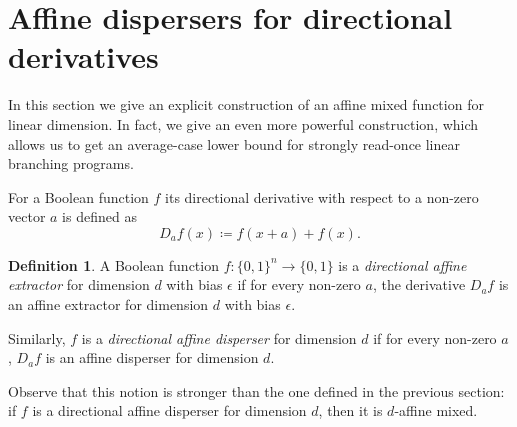 \documentclass[a4paper,11pt,draft]{article}
\newtheorem{proposition}[theorem]{Proposition}
\theoremstyle{definition}
\newtheorem{definition}[theorem]{Definition}
\theoremstyle{remark}
\DeclareMathOperator{\bias}{bias}
\DeclareMathOperator{\E}{\mathbb{E}}
\newcommand{\card}[1]{{\left|#1\right|}}
\newcommand{\Q}{{\{0,1\}}}
\newcommand{\restr}[2]{\left.#1\right|_{#2}}
\newcommand{\sreadonce}{strongly read-once}
\begin{document}
\section{Affine dispersers for directional derivatives}

In this section we give an explicit construction of an affine mixed function for linear dimension. In fact, we give an even more powerful construction, which allows us to get an average-case lower bound for \sreadonce{} linear branching programs.

For a Boolean function $f$ its directional derivative with respect to a non-zero vector $a$ is defined as
\[
  D_{a} f(x) \coloneqq f(x+a) + f(x).
\]

\begin{definition}
  A Boolean function $f\colon \Q^n \to \Q$ is a \emph{directional affine extractor} for dimension $d$ with bias $\epsilon$ if for every non-zero $a$, the derivative $D_a f$ is an affine extractor for dimension $d$ with bias $\epsilon$.

  Similarly, $f$ is a \emph{directional affine disperser} for dimension $d$ if for every non-zero $a$, $D_a f$ is an affine disperser for dimension $d$.
\end{definition}

Observe that this notion is stronger than the one defined in the previous section: if $f$ is a directional affine disperser for dimension $d$, then it is $d$-affine mixed. %


\end{document}
